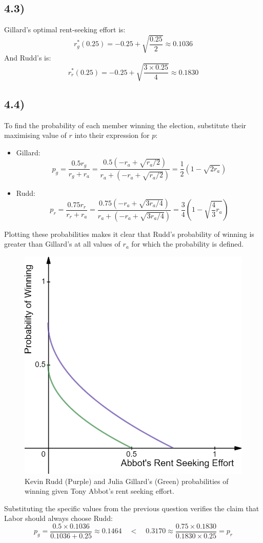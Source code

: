 \documentclass{article}
\begin{document}
\subsection*{4.3)}
Gillard's optimal rent-seeking effort is:
$$r_{g}^{*}(0.25) = -0.25 + \sqrt{\frac{0.25}{2}} \approx 0.1036$$
And Rudd's is:
$$r_{r}^{*}(0.25) = -0.25 + \sqrt{\frac{3 \times 0.25}{4}} \approx 0.1830$$

\subsection*{4.4)}
To find the probability of each member winning the election, substitute their maximising value of $r$ into their expression for $p$:
\begin{itemize}
    \item Gillard: $$p_{g} = \frac{0.5r_{g}}{r_{g} + r_{a}} = \frac{0.5(-r_{a} + \sqrt{{r_{a}}/{2}})}{r_{a} + (-r_{a} + \sqrt{{r_{a}}/{2}})} = \frac{1}{2} \left( 1 - \sqrt{2 r_{a}} \right)$$
    \item Rudd: $$p_{r} = \frac{0.75r_{r}}{r_{r} + r_{a}} = \frac{0.75(-r_{a} + \sqrt{{3r_{a}}/{4}})}{r_{a} + (-r_{a} + \sqrt{{3r_{a}}/{4}})} = \frac{3}{4} \left( 1 - \sqrt{\frac{4}{3} r_{a}} \right)$$
\end{itemize}
Plotting these probabilities makes it clear that Rudd's probability of winning is greater than Gillard's at all values of $r_{a}$ for which the probability is defined.
\begin{figure}[H]
    \centering
    \includegraphics[width=0.6\linewidth]{probabilities.png}
    \caption{Kevin Rudd (Purple) and Julia Gillard's (Green) probabilities of winning given Tony Abbot's rent seeking effort.}
    \label{fig:probabilities}
\end{figure}
Substituting the specific values from the previous question verifies the claim that Labor should always choose Rudd:
$$p_{g} = \frac{0.5 \times 0.1036}{0.1036 + 0.25} \approx 0.1464 \quad < \quad 0.3170 \approx \frac{0.75 \times 0.1830}{0.1830 \times 0.25} = p_{r}$$
\end{document}

